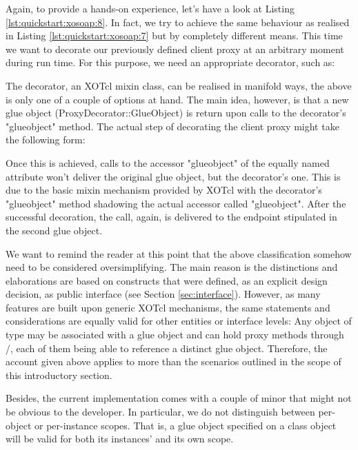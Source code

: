 Again, to provide a hands-on experience, let's have a look at Listing \ref{lst:quickstart:xosoap:8}. In fact, we try to achieve the same behaviour as realised in Listing \ref{lst:quickstart:xosoap:7} but by completely different means. This time we want to decorate our previously defined client proxy at an arbitrary moment during run time. For this purpose, we need an appropriate decorator, such as:
%
%

%
The decorator, an XOTcl mixin class, can be realised in manifold ways, the above is only one of a couple of options at hand. The main idea, however, is that a new glue object (ProxyDecorator::GlueObject) is return upon calls to the decorator's "glueobject" method. The actual step of decorating the client proxy might take the following form:
%
% 

% 
Once this is achieved, calls to the accessor "glueobject" of the equally named attribute won't deliver the original glue object, but the decorator's one. This is due to the basic mixin mechanism provided by XOTcl with the decorator's "glueobject" method shadowing the actual accessor called "glueobject". 
After the successful decoration, the call, again, is delivered to the endpoint stipulated in the second glue object.

We want to remind the reader at this point that the above classification somehow need to be considered oversimplifying. The main reason is the distinctions and elaborations are based on constructs that were defined, as an explicit design decision, as public interface (see Section \ref{sec:interface}). However,  as many features are built upon generic XOTcl mechanisms, the same statements and considerations are equally valid for other entities or interface levels: Any object of type  may be associated with a glue object and can hold proxy methods through /, each of them being able to reference a distinct glue object. Therefore, the account given above applies to more than the scenarios outlined in the scope of this introductory section.

Besides, the current implementation comes with a couple of minor that might not be obvious to the developer. In particular, we do not distinguish between per-object or per-instance scopes. That is, a glue object specified on a class object will be valid for both its instances' and its own scope.
%
